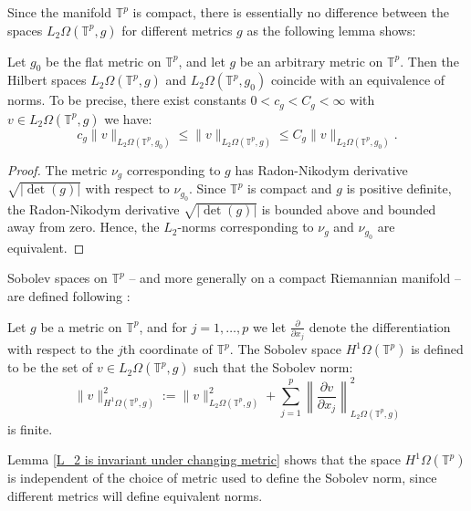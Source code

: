     Since the manifold $\mathbb{T}^p$ is compact, there is essentially no difference between the spaces $L_2\Omega(\mathbb{T}^p,g)$ for different metrics $g$ as the following lemma shows:
    \begin{lem}\label{L_2 is invariant under changing metric}
        Let $g_0$ be the flat metric on $\mathbb{T}^p$, and let $g$ be an arbitrary metric on $\mathbb{T}^p$. Then the Hilbert spaces $L_2\Omega(\mathbb{T}^p,g)$ and $L_2\Omega(\mathbb{T}^p,g_0)$
        coincide with an equivalence of norms. To be precise, there exist constants $0 < c_g < C_g < \infty$ with $v \in L_2\Omega(\mathbb{T}^p,g)$ we have:
        \begin{equation*}
            c_g\|v\|_{L_2\Omega(\mathbb{T}^p,g_0)} \leq \|v\|_{L_2\Omega(\mathbb{T}^p,g)} \leq C_g\|v\|_{L_2\Omega(\mathbb{T}^p,g_0)}.
        \end{equation*}
    \end{lem}
    \begin{proof}
        The metric $\nu_g$ corresponding to $g$ has Radon-Nikodym derivative $\sqrt{|\det(g)|}$ with respect to $\nu_{g_0}$. Since $\mathbb{T}^p$
        is compact and $g$ is positive definite, the Radon-Nikodym derivative $\sqrt{|\det(g)|}$ is bounded above and bounded away from zero. Hence,
        the $L_2$-norms corresponding to $\nu_g$ and $\nu_{g_0}$ are equivalent.
    \end{proof}
    
    Sobolev spaces on $\mathbb{T}^p$ {  -- and more generally on a compact Riemannian manifold -- are defined following \cite{Lawson-Michelsohn-1989}:}
    \begin{defi}
        Let $g$ be a metric on $\mathbb{T}^p$, and for $j=1,\ldots,p$ we let $\frac{\partial}{\partial x_j}$ denote the differentiation
        with respect to the $j$th coordinate of $\mathbb{T}^p$. The Sobolev space $H^1\Omega(\mathbb{T}^p)$ is defined to be the set of $v \in L_2\Omega(\mathbb{T}^p,g)$ such that the Sobolev norm:
        \begin{equation*}
            \|v\|_{H^1\Omega(\mathbb{T}^p,g)}^2 := \|v\|_{L_2\Omega(\mathbb{T}^p,g)}^2 + \sum_{j=1}^p \left\|\frac{\partial v}{\partial x_j}\right\|_{L_2\Omega(\mathbb{T}^p,g)}^2
        \end{equation*}
        is finite.
    \end{defi}
    Lemma \ref{L_2 is invariant under changing metric} shows that the space $H^1\Omega(\mathbb{T}^p)$ is independent of the choice of metric used to define the Sobolev norm,
    since different metrics will define equivalent norms.
        
